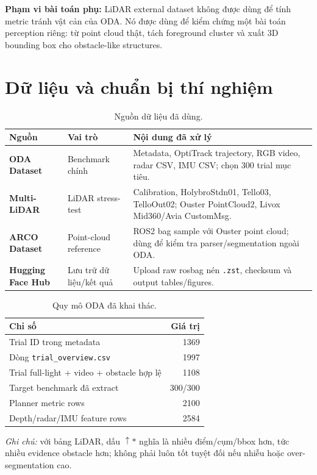 \documentclass[10pt,a4paper]{article}
\newcommand{\code}[1]{\texttt{#1}}
\begin{document}
\textbf{Phạm vi bài toán phụ:} LiDAR external dataset không được dùng để tính metric tránh vật cản của ODA. Nó được dùng để kiểm chứng một bài toán perception riêng: từ point cloud thật, tách foreground cluster và xuất 3D bounding box cho obstacle-like structures.

\section{Dữ liệu và chuẩn bị thí nghiệm}

\begin{table}[H]
\centering
\small
\caption{Nguồn dữ liệu đã dùng.}
\begin{tabularx}{0.98\linewidth}{>{\bfseries}p{3.3cm} p{3.5cm} X}
\toprule
Nguồn & Vai trò & Nội dung đã xử lý \\
\midrule
ODA Dataset & Benchmark chính & Metadata, OptiTrack trajectory, RGB video, radar CSV, IMU CSV; chọn 300 trial mục tiêu. \\
Multi-LiDAR & LiDAR stress-test & Calibration, HolybroStdn01, Tello03, TelloOut02; Ouster PointCloud2, Livox Mid360/Avia CustomMsg. \\
ARCO Dataset & Point-cloud reference & ROS2 bag sample với Ouster point cloud; dùng để kiểm tra parser/segmentation ngoài ODA. \\
Hugging Face Hub & Lưu trữ dữ liệu/kết quả & Upload raw rosbag nén \code{.zst}, checksum và output tables/figures. \\
\bottomrule
\end{tabularx}
\end{table}

\begin{table}[H]
\centering
\small
\caption{Quy mô ODA đã khai thác.}
\begin{tabular}{lr}
\toprule
Chỉ số & Giá trị \\
\midrule
Trial ID trong metadata & 1369 \\
Dòng \code{trial\_overview.csv} & 1997 \\
Trial full-light + video + obstacle hợp lệ & 1108 \\
Target benchmark đã extract & 300/300 \\
Planner metric rows & 2100 \\
Depth/radar/IMU feature rows & 2584 \\
\bottomrule
\end{tabular}
\end{table}
{\small \emph{Ghi chú:} với bảng LiDAR, dấu $\uparrow*$ nghĩa là nhiều điểm/cụm/bbox hơn, tức nhiều evidence obstacle hơn; không phải luôn tốt tuyệt đối nếu nhiễu hoặc over-segmentation cao.}
\end{document}

